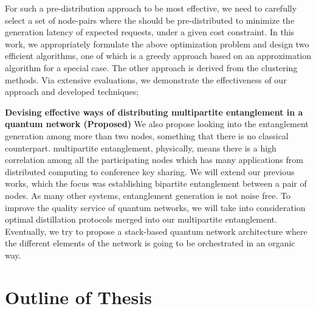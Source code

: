 For such a pre-distribution approach to be most effective, we need to carefully select a set of node-pairs where
the \epss should be pre-distributed to minimize the generation latency of expected \eps requests, under a given cost constraint.
In this work,
we appropriately formulate the above optimization problem and design two
efficient algorithms, one of which is a greedy approach based on an 
approximation algorithm for a special case. 
The other approach is derived from the clustering methods.
Via extensive evaluations, we demonstrate the effectiveness of our approach and developed techniques;  


\vspace{6pt}\noindent \textbf{Devising effective ways of distributing multipartite entanglement in a quantum network (Proposed)} 
We also propose looking into the entanglement generation among more than two nodes, something that there is no classical counterpart. 
multipartite entanglement, physically, means there is a high correlation among all the participating nodes which has many applications from distributed computing to conference key sharing.
We will extend our previous works, which the focus was establishing bipartite entanglement between a pair of nodes.
As many other systems, entanglement generation is not noise free. To improve the quality service of quantum networks, we will take into consideration optimal distillation protocols merged into our multipartite entanglement.
Eventually, we try to propose a stack-based quantum network architecture where the different elements of the network is going to be orchestrated in an organic way.



\section{Outline of Thesis}

